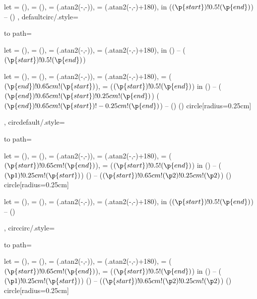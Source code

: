 {{{            %
            let
             = (\tikztostart),
             = (\tikztotarget),
             = (\tikztostart.{atan2(-,-)}),
             = (\tikztotarget.{atan2(-,-)+180}),
            in
            ($(\p{start})!0.5!(\p{end})$) -- ()
            \tikztonodes
        }
    },
    defaultcirc/.style={
        to path={
            let
             = (\tikztostart),
             = (\tikztotarget),
             = (\tikztostart.{atan2(-,-)}),
             = (\tikztotarget.{atan2(-,-)+180}),
            in
            () -- ($(\p{start})!0.5!(\p{end})$)
            \tikztonodes

            let
             = (\tikztostart),
             = (\tikztotarget),
             = (\tikztostart.{atan2(-,-)}),
             = (\tikztotarget.{atan2(-,-)+180}),
             = ($(\p{end})!0.65cm!(\p{start})$),
             = ($(\p{start})!0.5!(\p{end})$)
            in
            () -- ($(\p{end})!0.65cm!(\p{start})!0.25cm!(\p{end})$)
            ($(\p{end})!0.65cm!(\p{start})!-0.25cm!(\p{end})$) --
            ()
            () circle[radius=0.25cm]
            \tikztonodes
        }
    },
    circdefault/.style={
        to path={
            let
             = (\tikztostart),
             = (\tikztotarget),
             = (\tikztostart.{atan2(-,-)}),
             = (\tikztotarget.{atan2(-,-)+180}),
             = ($(\p{start})!0.65cm!(\p{end})$),
             = ($(\p{start})!0.5!(\p{end})$)
            in
            () -- ($(\p1)!0.25cm!(\p{start})$)
            () -- ($(\p{start})!0.65cm!(\p2)!0.25cm!(\p2)$)
            () circle[radius=0.25cm]
            \tikztonodes

            let
             = (\tikztostart),
             = (\tikztotarget),
             = (\tikztostart.{atan2(-,-)}),
             = (\tikztotarget.{atan2(-,-)+180}),
            in
            ($(\p{start})!0.5!(\p{end})$) -- ()
            \tikztonodes
        }
    },
    circcirc/.style={
        to path={
            let
             = (\tikztostart),
             = (\tikztotarget),
             = (\tikztostart.{atan2(-,-)}),
             = (\tikztotarget.{atan2(-,-)+180}),
             = ($(\p{start})!0.65cm!(\p{end})$),
             = ($(\p{start})!0.5!(\p{end})$)
            in
            () -- ($(\p1)!0.25cm!(\p{start})$)
            () -- ($(\p{start})!0.65cm!(\p2)!0.25cm!(\p2)$)
            () circle[radius=0.25cm]
            \tikztonodes

}}}
